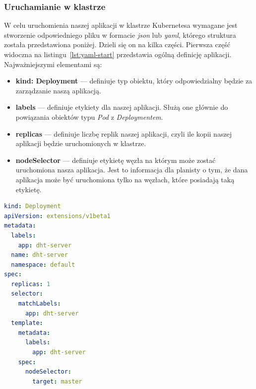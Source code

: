 \documentclass[12pt]{report}
\let\Oldsubsubsection\subsubsection
\renewcommand{\subsubsection}{\FloatBarrier\Oldsubsubsection}
\begin{document}
{\subsubsection{Uruchamianie w klastrze}
W celu uruchomienia naszej aplikacji w klastrze Kubernetesa wymagane jest stworzenie odpowiedniego pliku w formacie \textit{json} lub \textit{yaml}, którego struktura została przedstawiona poniżej. Dzieli się on na kilka części. Pierwsza część widoczna na listingu~\ref{lst:yaml-start} przedstawia ogólną definicję aplikacji. Najważniejszymi elementami są:
\begin{itemize}
\item{\textbf{kind: Deployment} --- definiuje typ obiektu, który odpowiedzialny będzie za zarządzanie naszą aplikacją.}
\item{\textbf{labels} --- definiuje etykiety dla naszej aplikacji. Służą one głównie do powiązania obiektów typu \textit{Pod} z \textit{Deploymentem}.}
\item{\textbf{replicas} --- definiuje liczbę replik naszej aplikacji, czyli ile kopii naszej aplikacji będzie uruchomionych w klastrze.}
\item{\textbf{nodeSelector} --- definiuje etykietę węzła na którym może zostać uruchomiona nasza aplikacja. Jest to informacja dla planisty o tym, że dana aplikacja może być uruchomiona tylko na węzłach, które posiadają taką etykietę.}
\end{itemize}

\begin{lstlisting}[language=yaml,caption=Definicja aplikacji uruchamianej w klastrze - część 1,label=lst:yaml-start]
kind: Deployment
apiVersion: extensions/v1beta1
metadata:
  labels:
    app: dht-server
  name: dht-server
  namespace: default
spec:
  replicas: 1
  selector:
    matchLabels:
      app: dht-server
  template:
    metadata:
      labels:
        app: dht-server
    spec:
      nodeSelector:
        target: master
\end{lstlisting}

}
\end{document}
